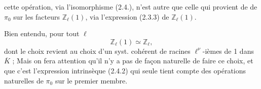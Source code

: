 cette opération, via l'isomorphisme (2.4.),  n'est autre que celle qui provient de   de \(\pi_0\) sur les facteurs \(\mathbb Z_\ell(1)\), via l'expression (2.3.3) de \(\mathbb Z_\ell(1)\).

Bien entendu, pour tout \(\ell\)    
\[
\mathbb Z_\ell(1)\simeq\mathbb Z_\ell,
\]
dont le choix revient au choix d'un syst. cohérent de racines  \(\ell^\nu\)-ièmes de 1 dans \(\overline K\) ; Mais on fera attention qu'il n'y a pas de façon naturelle de faire ce choix, et que c'est l'expression intrinsèque (2.4.2) qui seule  tient compte des opérations naturelles de \(\pi_0\) sur le premier membre.

